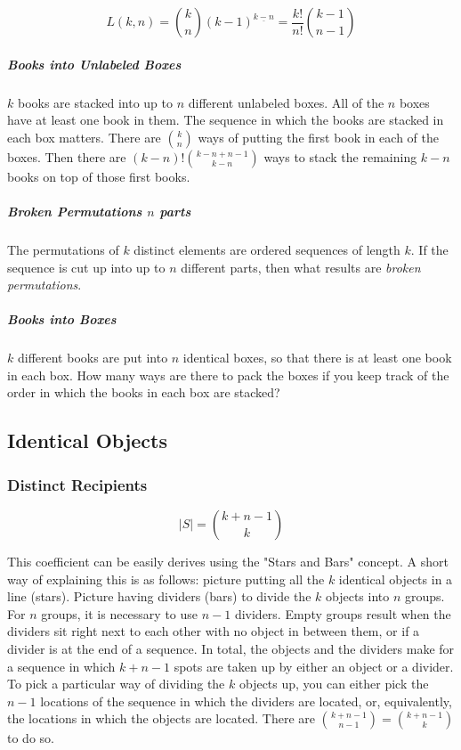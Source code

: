 \begin{equation}
L(k,n)= {k \choose n} (k-1)^{\underline{k-n}} = \frac{k!}{n!}{ k-1 \choose n-1 }
\end{equation}
	
\subparagraph{Books into Unlabeled Boxes} $k$ books are stacked into up to $n$ different unlabeled boxes. All of the $n$ boxes have at least one book in them. The sequence in which the books are stacked in each box matters. There are ${k \choose n}$ ways of putting the first book in each of the boxes. Then there are $(k-n)!{k-n+n-1 \choose k-n}$ ways to stack the remaining $k-n$ books on top of those first books. 

\subparagraph{Broken Permutations $n$ parts} The permutations of $k$ distinct elements are ordered sequences of length $k$. If the sequence is cut up into up to $n$ different parts, then what results are \textit{broken permutations}.

\subparagraph{Books into Boxes} $k$ different books are put into $n$ identical boxes, so that there is at least one book in each box. How many ways are there to pack the boxes if you keep track of the order in which the books in each box are stacked? 


\subsection{Identical Objects}

\subsubsection{Distinct Recipients}

\begin{equation}
|S| = {k+n-1 \choose k}
\end{equation}

This coefficient can be easily derives using the "Stars and Bars" concept. A short way of explaining this is as follows: picture putting all the $k$ identical objects in a line (stars). Picture having dividers (bars) to divide the $k$ objects into $n$ groups. For $n$ groups, it is necessary to use $n-1$ dividers. Empty groups result when the dividers sit right next to each other with no object in between them, or if a divider is at the end of a sequence. In total, the objects and the dividers make for a sequence in which $k+n-1$ spots are taken up by either an object or a divider. To pick a particular way of dividing the $k$ objects up, you can either pick the $n-1$ locations of the sequence in which the dividers are located, or, equivalently, the locations in which the objects are located. There are ${k+n-1\choose n-1}={k+n-1\choose k}$ to do so.  

